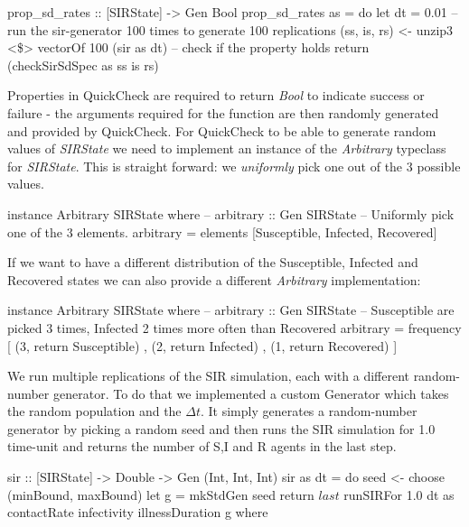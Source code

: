 \begin{HaskellCode}
prop_sd_rates :: [SIRState] -> Gen Bool
prop_sd_rates as = do
  let dt = 0.01
  -- run the sir-generator 100 times to generate 100 replications
  (ss, is, rs) <- unzip3 <\$> vectorOf 100 (sir as dt)
  -- check if the property holds
  return (checkSirSdSpec as ss is rs)
\end{HaskellCode}

Properties in QuickCheck are required to return \textit{Bool} to indicate success or failure - the arguments required for the function are then randomly generated and provided by QuickCheck. For QuickCheck to be able to generate random values of \textit{SIRState} we need to implement an instance of the \textit{Arbitrary} typeclass for \textit{SIRState}. This is straight forward: we \textit{uniformly} pick one out of the 3 possible values.

\begin{HaskellCode}
instance Arbitrary SIRState where
  -- arbitrary :: Gen SIRState
  -- Uniformly pick one of the 3 elements.
  arbitrary = elements [Susceptible, Infected, Recovered]
\end{HaskellCode}

If we want to have a different distribution of the Susceptible, Infected and Recovered states we can also provide a different \textit{Arbitrary} implementation:

\begin{HaskellCode}
instance Arbitrary SIRState where
  -- arbitrary :: Gen SIRState
  -- Susceptible are picked 3 times, Infected 2 times more often than Recovered
  arbitrary = frequency [ (3, return Susceptible)
                        , (2, return Infected)
                        , (1, return Recovered) ]
\end{HaskellCode}

We run multiple replications of the SIR simulation, each with a different random-number generator. To do that we implemented a custom Generator which takes the random population and the $\Delta t$. It simply generates a random-number generator by picking a random seed and then runs the SIR simulation for 1.0 time-unit and returns the number of S,I and R agents in the last step.

\begin{HaskellCode}
sir :: [SIRState] -> Double -> Gen (Int, Int, Int)
sir as dt = do
  seed <- choose (minBound, maxBound)
  let g = mkStdGen seed
  return $
    last $ 
    runSIRFor 1.0 dt as contactRate infectivity illnessDuration g
  where
    
\end{HaskellCode}


